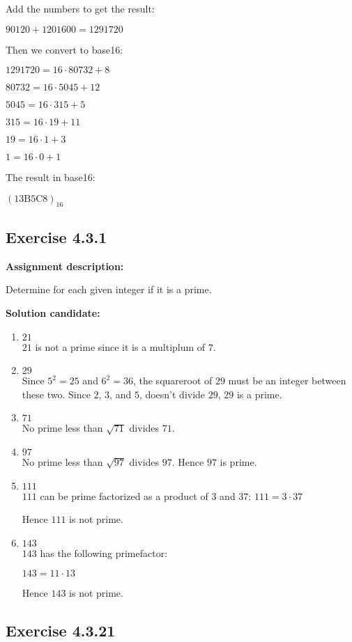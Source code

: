 \documentclass{report}
\newcommand{\cent}[1]{\begin{center}#1\end{center}}
\newcommand{\AssignmentDescription}{\textbf{Assignment description: }}
\newcommand{\Solution}{\textbf{Solution candidate: }}
\newcommand{\Exercise}[1]{\subsection{Exercise #1}}
\newcommand{\defaultEnumerateLabel}{\textbf{\alph*.}}
\newcommand{\MyItem}[1]{\item #1\\}
\newcommand{\hexadec}[1]{(\text{#1})_{16}}
\begin{document}
\begin{enumerate}[label=\defaultEnumerateLabel]
\begin{enumerate}[label = \defaultEnumerateLabel]
		Add the numbers to get the result:
		
		\cent{$90120+1201600 = 1291720$}
		
		Then we convert to base16:
		
		\cent{$1291720 = 16 \cdot 80732 +8$}
		\cent{$80732 = 16 \cdot 5045 +12$}
		\cent{$5045 = 16 \cdot 315 +5$}
		\cent{$315 = 16 \cdot 19 +11$}
		\cent{$19 = 16 \cdot 1 +3$}
		\cent{$1 = 16 \cdot 0 + 1$}
		
		The result in base16:
		
		\cent{$\hexadec{13B5C8}$}
	\end{enumerate}
	
	\Exercise{4.3.1}
	
	\AssignmentDescription
	
	Determine for each given integer if it is a prime.
	
	\Solution
	
	\begin{enumerate}[label=\defaultEnumerateLabel]
		\MyItem{$21$}
		
		$21$ is not a prime since it is a multiplum of $7$.\\
		
		\MyItem{$29$}
		
		Since $5^2 = 25$ and $6^2 = 36$, the squareroot of $29$ must be an integer between these two. Since $2$, $3$, and $5$, doesn't divide $29$, $29$ is a prime.\\
		
		\MyItem{$71$}
		
		No prime less than $\sqrt{71}$ divides $71$.\\
		
		\MyItem{$97$}
		
		No prime less than $\sqrt{97}$ divides $97$. Hence $97$ is prime.\\
		
		\MyItem{$ 111 $}
		
		$111$ can be prime factorized as a product of $3$ and $37$:
		$ 111 = 3 \cdot 37$ 
		
		Hence $111$ is not prime. \\
		
		\MyItem{$143$}
		
		$143$ has the following primefactor:
		
		\cent{$143 = 11 \cdot 13$}
		
		Hence $143$ is not prime.\\
		
	\end{enumerate}
	\Exercise{4.3.21}
	

\end{enumerate}
\end{document}
